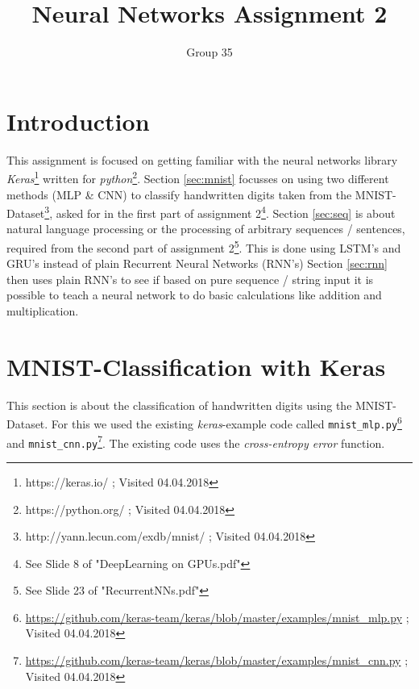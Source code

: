 \documentclass{article}
\begin{document}
\title{Neural Networks Assignment 2}
\author{Group 35}
\maketitle
\lstset{
  basicstyle=\ttfamily,
  keywordstyle=\bfseries,
  language=Java,
  frame=single,
  aboveskip=11pt,
  belowskip=11pt,
  breaklines=true,
  breakatwhitespace=false,
  showspaces=false,
  showstringspaces=false,
  numbers=left,
  stepnumber=1,    
  firstnumber=1,
  numberfirstline=true
}

\section{Introduction}
This assignment is focused on getting familiar with the neural networks library \textit{Keras}\footnote{https://keras.io/ ; Visited 04.04.2018} written for \textit{python}\footnote{https://python.org/ ; Visited 04.04.2018}.
Section \ref{sec:mnist} focusses on using two different methods (MLP \& CNN) to classify handwritten digits taken from the MNIST-Dataset\footnote{http://yann.lecun.com/exdb/mnist/ ; Visited 04.04.2018}, asked for in the first part of assignment 2\footnote{See Slide 8 of "DeepLearning on GPUs.pdf"}.
Section \ref{sec:seq} is about natural language processing or the processing of arbitrary sequences / sentences,  required from the second part of assignment 2\footnote{See Slide 23 of "RecurrentNNs.pdf"}. This is done using LSTM's and GRU's instead of plain Recurrent Neural Networks (RNN's)
Section \ref{sec:rnn} then uses plain RNN's to see if based on pure sequence / string input it is possible to teach a neural network to do basic calculations like addition and multiplication.

\section{MNIST-Classification with Keras}
\label{task-1}


\label{sec:mnist}
This section is about the classification of handwritten digits using the MNIST-Dataset.
For this we used the existing \textit{keras}-example code called \texttt{mnist\_mlp.py}\footnote{\url{https://github.com/keras-team/keras/blob/master/examples/mnist_mlp.py} ; Visited 04.04.2018} and \texttt{mnist\_cnn.py}\footnote{\url{https://github.com/keras-team/keras/blob/master/examples/mnist_cnn.py} ; Visited 04.04.2018}. 
The existing code uses the \textit{cross-entropy error} function.
\end{document}
